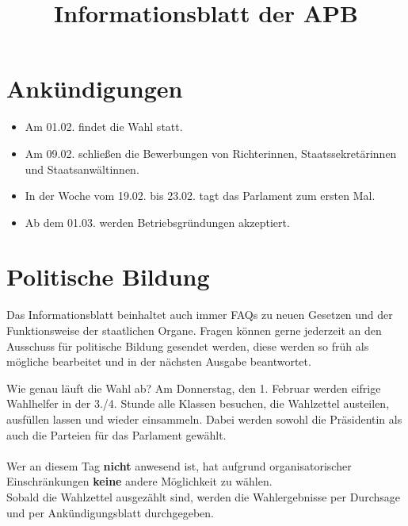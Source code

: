 \documentclass{sasbase}
\begin{document}
\title{Informationsblatt der APB}

\setcounter{secnumdepth}{5}

\mytitle

\parensstyle

\section{Ankündigungen}
\begin{itemize}
    \item Am 01.02. findet die Wahl statt.
    \item Am 09.02. schließen die Bewerbungen von Richterinnen, Staatssekretärinnen und Staatsanwältinnen.
    \item In der Woche vom 19.02. bis 23.02. tagt das Parlament zum ersten Mal.
    \item Ab dem 01.03. werden Betriebsgründungen akzeptiert.
\end{itemize}
\section{Politische Bildung}
Das Informationsblatt beinhaltet auch immer FAQs zu neuen Gesetzen und der Funktionsweise der staatlichen Organe.
Fragen k\"{o}nnen gerne jederzeit an den Ausschuss f\"{u}r politische Bildung gesendet werden, diese werden so fr\"{u}h als m\"{o}gliche bearbeitet und in der n\"{a}chsten Ausgabe beantwortet.


\begin{question}{Wie genau läuft die Wahl ab?}
    Am Donnerstag, den 1. Februar werden eifrige Wahlhelfer in der 3./4. Stunde alle Klassen besuchen, die Wahlzettel austeilen,
    ausfüllen lassen und wieder einsammeln. Dabei werden sowohl die Präsidentin als auch die
    Parteien für das Parlament gewählt.
    \\\\
    \noindent Wer an diesem Tag \textbf{nicht} anwesend ist, hat aufgrund organisatorischer Einschränkungen \textbf{keine} andere Möglichkeit zu wählen.
    \\
    
    \noindent Sobald die Wahlzettel ausgezählt sind, werden die Wahlergebnisse per Durchsage und per
    Ankündigungsblatt durchgegeben.
\end{question}

\newpage
\end{document}
